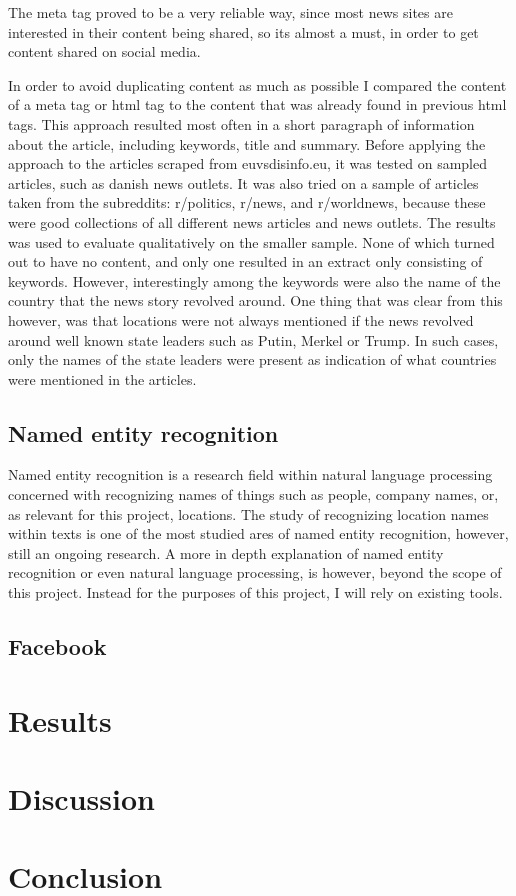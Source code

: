 \documentclass{article}
\begin{document}
The meta tag proved to be a very reliable way, since most news sites are interested in their content being shared, so its almost a must, in order to get content shared on social media.

In order to avoid duplicating content as much as possible I compared the content of a meta tag or html tag to the content that was already found in previous html tags. This approach resulted most often in a short paragraph of information about the article, including keywords, title and summary. Before applying the approach to the articles scraped from euvsdisinfo.eu, it was tested on sampled articles, such as danish news outlets. It was also tried on a sample of articles taken from the subreddits: r/politics, r/news, and r/worldnews, because these were good collections of all different news articles and news outlets. The results was used to evaluate qualitatively on the smaller sample. None of which turned out to have no content, and only one resulted in an extract only consisting of keywords. However, interestingly among the keywords were also the name of the country that the news story revolved around.
One thing that was clear from this however, was that locations were not always mentioned if the news revolved around well known state leaders such as Putin, Merkel or Trump. In such cases, only the names of the state leaders were present as indication of what countries were mentioned in the articles.

\subsection{Named entity recognition}
Named entity recognition is a research field within natural language processing concerned with recognizing names of things such as people, company names, or, as relevant for this project, locations. The study of recognizing location names within texts is one of the most studied ares of named entity recognition, however, still an ongoing research. A more in depth explanation of named entity recognition or even natural language processing, is however, beyond the scope of this project. Instead for the purposes of this project, I will rely on existing tools.

\subsection{Facebook}

\section{Results}

\section{Discussion}

\section{Conclusion}
\end{document}
